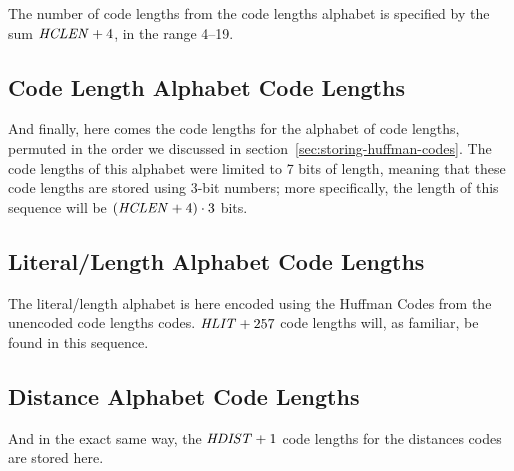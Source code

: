 The number of code lengths from the code lengths alphabet is specified
by the sum $\mathit{HCLEN} + 4$, in the range 4--19.

\subsection{Code Length Alphabet Code Lengths}

And finally, here comes the code lengths for the alphabet of code
lengths, permuted in the order we discussed in
section~\ref{sec:storing-huffman-codes}. The code lengths of this
alphabet were limited to 7 bits of length, meaning that these code
lengths are stored using 3-bit numbers; more specifically, the length
of this sequence will be $(\mathit{HCLEN} + 4) \cdot 3$ bits.

\subsection{Literal/Length Alphabet Code Lengths}

The literal/length alphabet is here encoded using the Huffman Codes
from the unencoded code lengths codes. $\mathit{HLIT} + 257$ code lengths
will, as familiar, be found in this sequence.

\subsection{Distance Alphabet Code Lengths}

And in the exact same way, the $\mathit{HDIST} + 1$ code lengths for the
distances codes are stored here.
